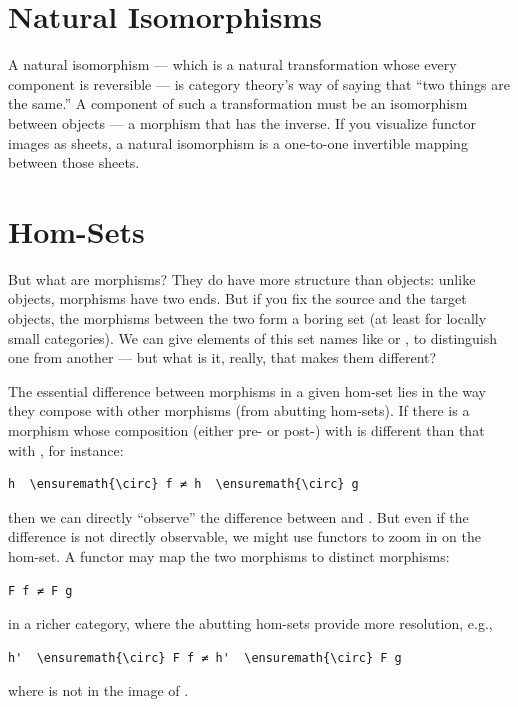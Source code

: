 \section{Natural Isomorphisms}\label{natural-isomorphisms}

A natural isomorphism --- which is a natural transformation whose every
component is reversible --- is category theory's way of saying that
``two things are the same.'' A component of such a transformation must
be an isomorphism between objects --- a morphism that has the inverse.
If you visualize functor images as sheets, a natural isomorphism is a
one-to-one invertible mapping between those sheets.

\section{Hom-Sets}\label{hom-sets}

But what are morphisms? They do have more structure than objects: unlike
objects, morphisms have two ends. But if you fix the source and the
target objects, the morphisms between the two form a boring set (at
least for locally small categories). We can give elements of this set
names like  or , to distinguish one from another ---
but what is it, really, that makes them different?

The essential difference between morphisms in a given hom-set lies in
the way they compose with other morphisms (from abutting hom-sets). If
there is a morphism  whose composition (either pre- or post-)
with  is different than that with , for instance:

\begin{Verbatim}[commandchars=\\\{\}]
h  \ensuremath{\circ} f ≠ h  \ensuremath{\circ} g
\end{Verbatim}
then we can directly ``observe'' the difference between  and
. But even if the difference is not directly observable, we
might use functors to zoom in on the hom-set. A functor  may
map the two morphisms to distinct morphisms:

\begin{Verbatim}[commandchars=\\\{\}]
F f ≠ F g
\end{Verbatim}
in a richer category, where the abutting hom-sets provide more
resolution, e.g.,

\begin{Verbatim}[commandchars=\\\{\}]
h'  \ensuremath{\circ} F f ≠ h'  \ensuremath{\circ} F g
\end{Verbatim}
where  is not in the image of .

